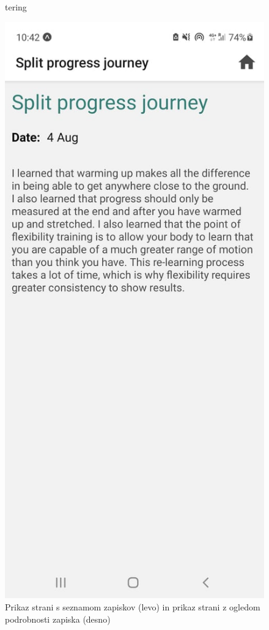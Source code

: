 \documentclass[a4paper, 12pt]{book}
\begin{document}
\begin{figure}[ht]
\begin{minipage}[b]{0.4\textwidth}
tering
  \end{minipage}
  \begin{minipage}[b]{0.4\textwidth}
    \includegraphics[width=\textwidth]{pregledzapiska.jpg}\centering
  \end{minipage}
    \caption{Prikaz strani s seznamom zapiskov (levo) in prikaz strani z ogledom podrobnosti zapiska (desno)}
    \label{zapiski2}
\end{figure}
\end{document}
